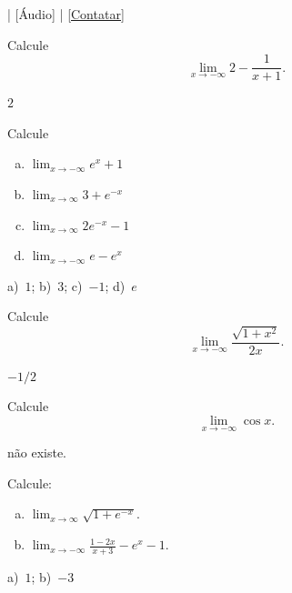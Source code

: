 \begin{flushright}
  [Vídeo] | [Áudio] | \href{https://phkonzen.github.io/notas/contato.html}{[Contatar]}
\end{flushright}

\begin{exer}
  Calcule
  \begin{equation}
    \lim_{x\to -\infty} 2 - \frac{1}{x+1}.
  \end{equation}
\end{exer}
\begin{resp}
  $2$
\end{resp}

\begin{exer}
  Calcule
\end{exer}
\begin{enumerate}[a)]
\item $\displaystyle \lim_{x\to -\infty} e^x+1$
\item $\displaystyle \lim_{x\to \infty} 3 + e^{-x}$
\item $\displaystyle \lim_{x\to \infty} 2e^{-x}-1$
\item $\displaystyle \lim_{x\to -\infty} e-e^{x}$
\end{enumerate}
\begin{resp}
  a)~$1$; b)~$3$; c)~$-1$; d)~$e$
\end{resp}

\begin{exer}
  Calcule
  \begin{equation}
    \lim_{x\to -\infty} \frac{\sqrt{1+x^2}}{2x}.
  \end{equation}
\end{exer}
\begin{resp}
  $-1/2$
\end{resp}

\begin{exer}
  Calcule
  \begin{equation}
    \lim_{x\to -\infty} \cos x.
  \end{equation}
\end{exer}
\begin{resp}
  não existe.
\end{resp}

\begin{exer}
  Calcule:
  \begin{enumerate}[a)]
  \item $\displaystyle\lim_{x\to \infty} \sqrt{1+e^{-x}}$.
  \item $\displaystyle\lim_{x\to -\infty} \frac{1-2x}{x+3} -e^{x} - 1$.
  \end{enumerate}
\end{exer}
\begin{resp}
  a)~$1$; b)~$-3$
\end{resp}

